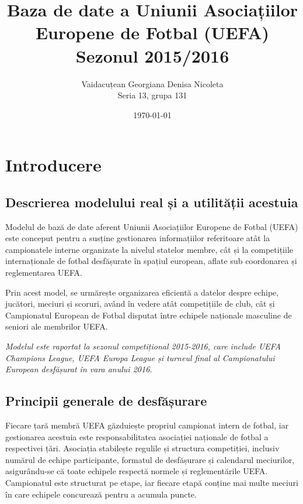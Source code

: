 \documentclass{article}
\title{Baza de date a Uniunii Asociațiilor Europene de Fotbal (UEFA) Sezonul 2015/2016}
\author{Vaidacuțean Georgiana Denisa Nicoleta \\ Seria 13, grupa 131}
\date{\today}
\begin{document}
	\sloppy
	\maketitle
	
	\newpage
	
	\section{Introducere}
	\subsection{Descrierea modelului real și a utilității acestuia}
	
	Modelul de bază de date aferent Uniunii Asociațiilor Europene de Fotbal (UEFA) este conceput pentru a susține gestionarea informațiilor referitoare atât la campionatele interne organizate la nivelul statelor membre, cât și la competițiile internaționale de fotbal desfășurate în spațiul european, aflate sub coordonarea și reglementarea UEFA.
	
	Prin acest model, se urmărește organizarea eficientă a datelor despre echipe, jucători, meciuri și scoruri, având în vedere atât competițiile de club, cât și Campionatul European de Fotbal disputat între echipele naționale masculine de seniori ale membrilor UEFA.
	
	\vspace{0.5cm}
	
	\textit{Modelul este raportat la sezonul competițional 2015-2016, care include UEFA Champions League, UEFA Europa League și turneul final al Campionatului European desfășurat în vara anului 2016.}
	
	\vspace{0.3cm}
	
	\subsection{Principii generale de desfășurare}
	
	Fiecare țară membră UEFA găzduiește propriul campionat intern de fotbal, iar gestionarea acestuia este responsabilitatea asociației naționale de fotbal a respectivei țări. Asociația stabilește regulile și structura competiției, inclusiv numărul de echipe participante, formatul de desfășurare și calendarul meciurilor, asigurându-se că toate echipele respectă normele și reglementările UEFA. Campionatul este structurat pe etape, iar fiecare etapă conține mai multe meciuri în care echipele concurează pentru a acumula puncte. 
	
\end{document}
